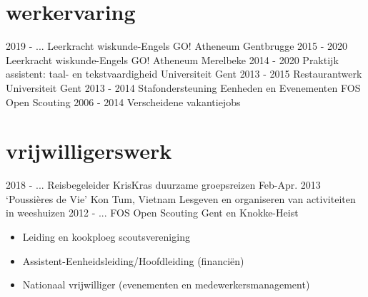 \documentclass[]{friggeri-cv}
\begin{document}
\section{werkervaring}
\vspace{-0.2cm}
\begin{entrylist}
  \vspace{-2.5mm}
  \entry
    {2019 - ...}
    {Leerkracht wiskunde-Engels}
    {GO! Atheneum Gentbrugge}
    {}
  \vspace{-2.5mm}
  \entry
    {2015 - 2020}
    {Leerkracht wiskunde-Engels}
    {GO! Atheneum Merelbeke}
    {}
  \vspace{-2.5mm}
  \entry
    {2014 - 2020}
    {Praktijk assistent: taal- en tekstvaardigheid}
    {Universiteit Gent}
    {}
  \vspace{-2.5mm}
  \entry
    {2013 - 2015}
    {Restaurantwerk}
    {Universiteit Gent}
    {}
  \vspace{-2.5mm}
  \entry
    {2013 - 2014}
    {Stafondersteuning Eenheden en Evenementen}
    {FOS Open Scouting}
    {}
  \vspace{-2.5mm}
  \entry
    {2006 - 2014}
    {Verscheidene vakantiejobs}
    {}
    {}
\end{entrylist}

\section{vrijwilligerswerk}
\vspace{-0.2cm}
\begin{entrylist}
    \entry
    {2018 - ...}
    {Reisbegeleider}
    {KrisKras}
    {duurzame groepsreizen}
    \entry
    {\hspace{-1.5cm}Feb-Apr. 2013 }
    {‘Poussi\`eres de Vie’}
    {Kon Tum, Vietnam}
    {Lesgeven en organiseren van activiteiten in weeshuizen}
    \entry
    {2012 - ...}
    {FOS Open Scouting}
    {Gent en Knokke-Heist}
    {\vspace{-0.25cm}\begin{itemize}
      \item Leiding en kookploeg scoutsvereniging
      \item Assistent-Eenheidsleiding/Hoofdleiding (financi\"en)
      \item Nationaal vrijwilliger (evenementen en medewerkersmanagement)
    \end{itemize}}
\end{entrylist}
\end{document}
